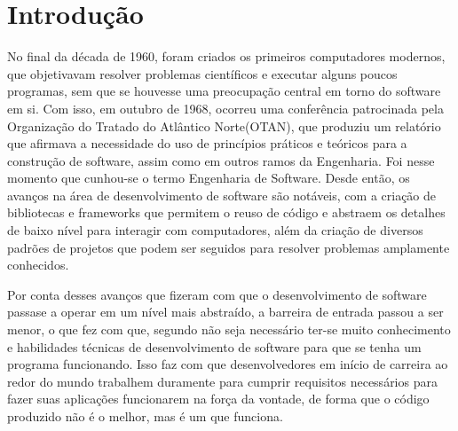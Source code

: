 \documentclass[12pt, %
openright, 
oneside, %
a4paper,    %
brazil]{facom-ufu-abntex2}
\begin{document}

\tableofcontents*
\cleardoublepage





\textual



\chapter[Introdução]{Introdução} \label{chapt:introduction}

No final da década de 1960, foram criados os primeiros computadores modernos, que objetivavam resolver problemas científicos e executar alguns poucos programas, sem que se houvesse uma preocupação central em torno do software em si. Com isso, em outubro de 1968, ocorreu uma conferência patrocinada pela Organização do Tratado do Atlântico Norte(OTAN), que produziu um relatório que afirmava a necessidade do uso de princípios práticos e teóricos para a construção de software, assim como em outros ramos da Engenharia. Foi nesse momento que cunhou-se o termo Engenharia de Software. Desde então, os avanços na área de desenvolvimento de software são notáveis, com a criação de bibliotecas e frameworks que permitem o reuso de código e abstraem os detalhes de baixo nível para interagir com computadores, além da criação de diversos padrões de projetos que podem ser seguidos para resolver problemas amplamente conhecidos\cite{engsoftmoderna}.

Por conta desses avanços que fizeram com que o desenvolvimento de software passase a operar em um nível mais abstraído, a barreira de entrada passou a ser menor, o que fez com que, segundo  não seja necessário ter-se muito conhecimento e habilidades técnicas de desenvolvimento de software para que se tenha um programa funcionando. Isso faz com que desenvolvedores em início de carreira ao redor do mundo trabalhem duramente para cumprir requisitos necessários para fazer suas aplicações funcionarem na força da vontade, de forma que o código produzido não é o melhor, mas é um que funciona.
\end{document}
